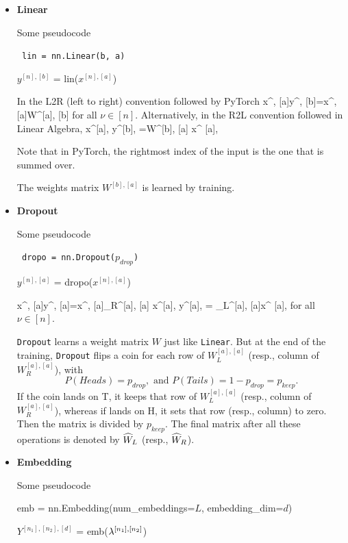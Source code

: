 \begin{itemize}
\item {\bf Linear}

Some pseudocode
\begin{mybluearea}
{\tt
lin = nn.Linear(b, a)

$y^{[n], [b]}$ = lin($x^{[n],[a]}$)
}
\end{mybluearea}
In the L2R (left to right) convention followed by PyTorch
\beq
x^{\nu, [a]}\rarrow y^{\nu, [b]}=x^{\nu, [a]}W^{[a], [b]}
\eeq
for all  $\nu\in[n]$. Alternatively, in
the R2L convention followed in Linear Algebra,
\beq
x^{[a], \nu}\rarrow y^{[b], \nu}=W^{[b], [a]}
x^{ [a], \nu}
\eeq

Note that in PyTorch, the rightmost index of the input is the
one that is summed over.

The weights matrix $W^{[b], [a]}$ is learned by training.

\item {\bf Dropout}

Some pseudocode
\begin{mybluearea}
{\tt
dropo = nn.Dropout($p_{drop}$)

$y^{[n], [a]}$ = dropo($x^{[n],[a]}$)
}
\end{mybluearea}


\beq
x^{\nu, [a]}\rarrow y^{\nu, [a]}=x^{\nu, [a]}_R^{[a], [a]}
\;\;
\eeq
\beq
x^{[a], \nu}\rarrow y^{[a], \nu}=
_L^{[a], [a]}x^{ [a],\nu}
\;\;
\eeq
for all  $\nu\in[n]$.

{\tt Dropout} learns a weight matrix $W$ just like
{\tt Linear}. But at the end of the
training,
{\tt  Dropout} flips a coin
for each row of $W_L^{[a], [a]}$ (resp., column of $W_R^{[a],
 [a]}$), with $$P(Heads)=p_{drop}, \text{ and } P(Tails)=1-p_{drop}=p_{keep}.$$If the coin lands on T, it keeps that row of $W_L^{[a], [a]}$ (resp., column of $W_R^{[a], [a]}$), whereas if lands on H,
it sets that row (resp., column) to zero. Then the
matrix  is
divided by $p_{keep}$.
The final matrix after all these operations  is denoted by ${\widehat{W}}_L$ (resp., ${\widehat{W}}_R$).



\item {\bf Embedding}

Some pseudocode
\begin{mybluearea}
{\tt

emb = nn.Embedding(num\_embeddings=$L$, embedding\_dim=$d$)

$Y^{[n_1], [n_2], [d]}$ =
emb($\lambda^{[n_1], [n_2]}$)
}
\end{mybluearea}


\end{itemize}
